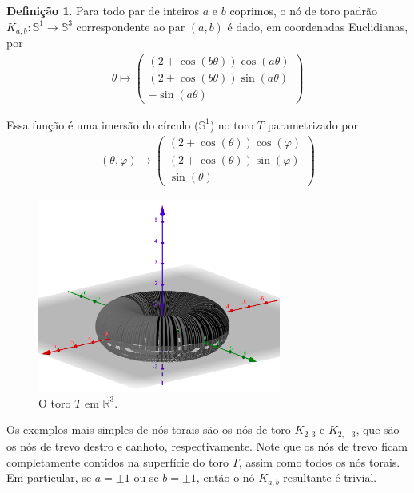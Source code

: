\documentclass[a4paper,portuguese,11pt,twoside, leqno]{book}
\theoremstyle{definition}
\newtheorem{deff}{Definição}[section]
\begin{document}
	\begin{deff}
		\label{def no de toro}
		Para todo par de inteiros $a$ e $b$ coprimos, o nó de toro padrão $K_{a,b}: \mathbb{S}^1\to\mathbb{S}^3$ correspondente ao par $(a,b)$ é dado, em coordenadas Euclidianas, por 
		\begin{align*}
		\theta\mapsto
		\left( 
		\begin{matrix}
		(2+\cos(b\theta))\cos(a\theta) \\
		(2+\cos(b\theta))\sin(a\theta) \\
		-\sin(a\theta)
		\end{matrix} 
		\right)
		\end{align*}	
	\end{deff}
	\par\vspace{0.3cm} Essa função é uma imersão do círculo ($\mathbb{S}^1$) no toro $T$ parametrizado por
	\begin{align*}
	(\theta, \varphi)\mapsto 
	\left( \begin{matrix}
	(2+\cos(\theta))\cos(\varphi) \\
	(2+\cos(\theta))\sin(\varphi) \\
	\sin(\theta)
	\end{matrix}  \right)
	\end{align*}
	\begin{figure}[H]
		\begin{center}
			\includegraphics[width=8cm]{Images/toro.png}
		\end{center}\caption{O toro $T$ em $\mathbb{R}^3$.}\label{toro}
	\end{figure}
	\par\vspace{0.3cm} Os exemplos mais simples de nós torais são os nós de toro $K_{2,3}$ e $K_{2,-3}$, que são os nós de trevo destro e canhoto, respectivamente. Note que os nós de trevo ficam completamente contidos na superfície do toro $T$, assim como todos os nós torais. Em particular, se $a = \pm1$ ou se $b = \pm1$, então o nó $K_{a,b}$ resultante é trivial.
	
\end{document}
